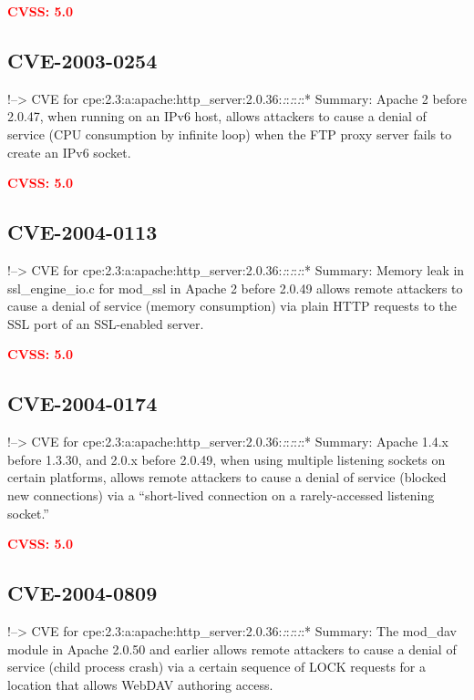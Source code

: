 \documentclass[a4paper, 12pt]{article}
\begin{document}
\textbf{\textcolor{red}{CVSS: 5.0}}

\hypertarget{cve-2003-0254}{%
\subsection{CVE-2003-0254}\label{cve-2003-0254}}

!--\textgreater{} CVE for
cpe:2.3:a:apache:http\_server:2.0.36:\emph{:}:\emph{:}:\emph{:}:*
Summary: Apache 2 before 2.0.47, when running on an IPv6 host, allows
attackers to cause a denial of service (CPU consumption by infinite
loop) when the FTP proxy server fails to create an IPv6 socket.

\textbf{\textcolor{red}{CVSS: 5.0}}

\hypertarget{cve-2004-0113}{%
\subsection{CVE-2004-0113}\label{cve-2004-0113}}

!--\textgreater{} CVE for
cpe:2.3:a:apache:http\_server:2.0.36:\emph{:}:\emph{:}:\emph{:}:*
Summary: Memory leak in ssl\_engine\_io.c for mod\_ssl in Apache 2
before 2.0.49 allows remote attackers to cause a denial of service
(memory consumption) via plain HTTP requests to the SSL port of an
SSL-enabled server.

\textbf{\textcolor{red}{CVSS: 5.0}}

\hypertarget{cve-2004-0174}{%
\subsection{CVE-2004-0174}\label{cve-2004-0174}}

!--\textgreater{} CVE for
cpe:2.3:a:apache:http\_server:2.0.36:\emph{:}:\emph{:}:\emph{:}:*
Summary: Apache 1.4.x before 1.3.30, and 2.0.x before 2.0.49, when using
multiple listening sockets on certain platforms, allows remote attackers
to cause a denial of service (blocked new connections) via a
``short-lived connection on a rarely-accessed listening socket.''

\textbf{\textcolor{red}{CVSS: 5.0}}

\hypertarget{cve-2004-0809}{%
\subsection{CVE-2004-0809}\label{cve-2004-0809}}

!--\textgreater{} CVE for
cpe:2.3:a:apache:http\_server:2.0.36:\emph{:}:\emph{:}:\emph{:}:*
Summary: The mod\_dav module in Apache 2.0.50 and earlier allows remote
attackers to cause a denial of service (child process crash) via a
certain sequence of LOCK requests for a location that allows WebDAV
authoring access.
\end{document}
